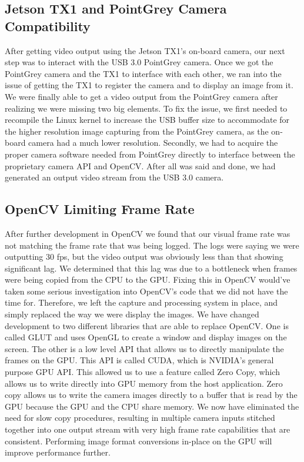 \documentclass[letterpaper,10pt,titlepage]{IEEEtran}
\begin{document}
   \subsection{Jetson TX1 and PointGrey Camera Compatibility}
   After getting video output using the Jetson TX1's on-board camera, our next step was to interact with the USB 3.0 PointGrey camera. Once we got the PointGrey camera and the TX1 to interface with each other, we ran into the issue of getting the TX1 to register the camera and to display an image from it. We were finally able to get a video output from the PointGrey camera after realizing we were missing two big elements. To fix the issue, we first needed to recompile the Linux kernel to increase the USB buffer size to accommodate for the higher resolution image capturing from the PointGrey camera, as the on-board camera had a much lower resolution. Secondly, we had to acquire the proper camera software needed from PointGrey directly to interface between the proprietary camera API and OpenCV. After all was said and done, we had generated an output video stream from the USB 3.0 camera. 
   
   \subsection{OpenCV Limiting Frame Rate}
   After further development in OpenCV we found that our visual frame rate was not matching the frame rate that was being logged. The logs were saying we were outputting 30 fps, but the video output was obviously less than that showing significant lag. We determined that this lag was due to a bottleneck when frames were being copied from the CPU to the GPU. Fixing this in OpenCV would've taken some serious investigation into OpenCV's code that we did not have the time for. Therefore, we left the capture and processing system in place, and simply replaced the way we were display the images. We have changed development to two different libraries that are able to replace OpenCV. One is called GLUT and uses OpenGL to create a window and display images on the screen. The other is a low level API that allows us to directly manipulate the frames on the GPU. This API is called CUDA, which is NVIDIA's general purpose GPU API. This allowed us to use a feature called Zero Copy, which allows us to write directly into GPU memory from the host application. Zero copy allows us to write the camera images directly to a buffer that is read by the GPU because the GPU and the CPU share memory. We now have eliminated the need for slow copy procedures, resulting in multiple camera inputs stitched together into one output stream with very high frame rate capabilities that are consistent. Performing image format conversions in-place on the GPU will improve performance further. 
   
\end{document}
